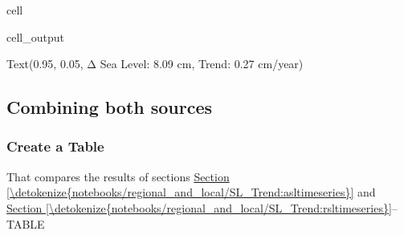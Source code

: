 \documentclass[letterpaper,10pt,english]{jupyterBook}
\begin{document}
\begin{sphinxuseclass}{cell}
\begin{sphinxVerbatimOutput}
\begin{sphinxuseclass}{cell_output}
\begin{sphinxVerbatim}[commandchars=\\\{\}]
Text(0.95, 0.05, \PYGZsq{}Δ Sea Level: 8.09 cm, Trend: 0.27 cm/year\PYGZsq{})
\end{sphinxVerbatim}

\noindent{}

\end{sphinxuseclass}\end{sphinxVerbatimOutput}

\end{sphinxuseclass}

\subsection{Combining both sources}
\label{\detokenize{notebooks/regional_and_local/SL_Trend:combining-both-sources}}

\subsubsection{Create a Table}
\label{\detokenize{notebooks/regional_and_local/SL_Trend:create-a-table}}\label{\detokenize{notebooks/regional_and_local/SL_Trend:id3}}
\sphinxAtStartPar
That compares the results of sections \hyperref[\detokenize{notebooks/regional_and_local/SL_Trend:asltimeseries}]{Section \ref{\detokenize{notebooks/regional_and_local/SL_Trend:asltimeseries}}} and \hyperref[\detokenize{notebooks/regional_and_local/SL_Trend:rsltimeseries}]{Section \ref{\detokenize{notebooks/regional_and_local/SL_Trend:rsltimeseries}}}– TABLE
\end{document}
